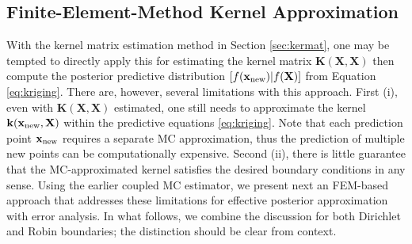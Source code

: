 \documentclass[aos,preprint]{imsart}
\theoremstyle{plain}
\newcommand{\cmtS}[1]{{\color{red}{(Simon: #1)}}}
\theoremstyle{remark}
\begin{document}

\subsection{Finite-Element-Method Kernel Approximation} \label{sec:fea}

With the kernel matrix estimation method in Section \ref{sec:kermat}, one may be tempted to directly apply this for estimating the kernel matrix $\mathbf{K}(\mathbf{X},\mathbf{X})$ then compute the posterior predictive distribution $[f(\mathbf{x}_{\rm new})|f(\mathbf{X})]$ from Equation \eqref{eq:kriging}. There are, however, several limitations with this approach. First (i), even with $\mathbf{K}(\mathbf{X},\mathbf{X})$ estimated, one still needs to approximate the kernel $\mathbf{k}(\mathbf{x}_{\rm new},\mathbf{X})$ within the predictive equations \eqref{eq:kriging}. Note that each prediction point $\mathbf{x}_{\rm new}$ requires a separate MC approximation, thus the prediction of multiple new points can be computationally expensive. Second (ii), there is little guarantee that the MC-approximated kernel satisfies the desired boundary conditions in any sense. Using the earlier coupled MC estimator, we present next an FEM-based approach that addresses these limitations for effective posterior approximation with error analysis. In what follows, we combine the discussion for both Dirichlet and Robin boundaries; the distinction should be clear from context.
\end{document}
